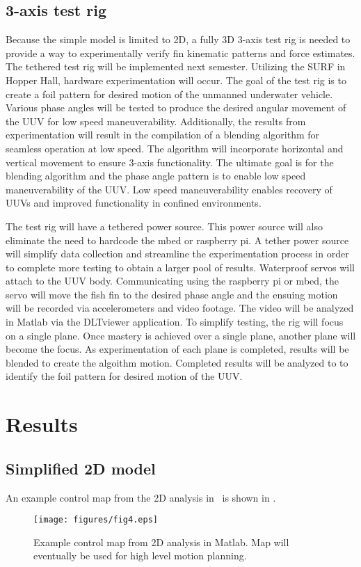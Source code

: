 \documentclass[twocolumn,10pt]{IEEEtran}
\begin{document}
\subsection{3-axis test rig}
Because the simple model is limited to 2D, a fully 3D 3-axis test rig is needed to provide a way to experimentally verify fin kinematic patterns and force estimates. The tethered test rig will be implemented next semester.  Utilizing the SURF in Hopper Hall, hardware experimentation will occur.  The goal of the test rig is to create a foil pattern for desired motion of the unmanned underwater vehicle.  Various phase angles will be tested to produce the desired angular movement of the UUV for low speed maneuverability.  Additionally, the results from experimentation will result in the compilation of a blending algorithm for seamless operation at low speed.  The algorithm will incorporate horizontal and vertical movement to ensure 3-axis functionality.  The ultimate goal is for the blending algorithm and the phase angle pattern is to enable low speed maneuverability of the UUV.  Low speed maneuverability enables recovery of UUVs and improved functionality in confined environments.  

The test rig will have a tethered power source.  This power source will also eliminate the need to hardcode the mbed or raspberry pi.  A tether power source will simplify data collection and streamline the experimentation process in order to complete more testing to obtain a larger pool of results.  Waterproof servos will attach to the UUV body.  Communicating using the raspberry pi or mbed, the servo will move the fish fin to the desired phase angle and the ensuing motion will be recorded via accelerometers and video footage.  The video will be analyzed in Matlab via the DLTviewer application.  To simplify testing, the rig will focus on a single plane.  Once mastery is achieved over a single plane, another plane will become the focus.  As experimentation of each plane is completed, results will be blended to create the algoithm motion.  Completed results will be analyzed to to identify the foil pattern for desired motion of the UUV. 





\section{Results}

\subsection{Simplified 2D model}
An example control map from the 2D analysis in \Matlab\ is shown in . 
\begin{figure}
\begin{center}
\texttt{[image: figures/fig4.eps]}
\end{center}
\caption{Example control map from 2D analysis in Matlab. Map will eventually be used for high level motion planning.}
\label{fig:controlmap}
\end{figure}
\end{document}
